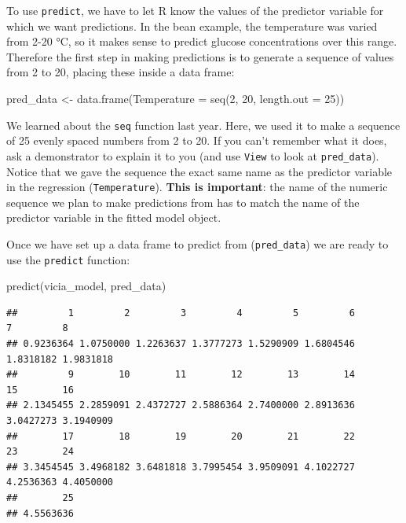 \documentclass[
]{book}
\newenvironment{Shaded}{\begin{snugshade}}{\end{snugshade}}
\newcommand{\AttributeTok}[1]{\textcolor[rgb]{0.77,0.63,0.00}{#1}}
\newcommand{\DecValTok}[1]{\textcolor[rgb]{0.00,0.00,0.81}{#1}}
\newcommand{\FunctionTok}[1]{\textcolor[rgb]{0.00,0.00,0.00}{#1}}
\newcommand{\NormalTok}[1]{#1}
\newcommand{\OtherTok}[1]{\textcolor[rgb]{0.56,0.35,0.01}{#1}}
\begin{document}
To use \texttt{predict}, we have to let R know the values of the predictor variable for which we want predictions. In the bean example, the temperature was varied from 2-20 °C, so it makes sense to predict glucose concentrations over this range. Therefore the first step in making predictions is to generate a sequence of values from 2 to 20, placing these inside a data frame:

\begin{Shaded}
\begin{Highlighting}[]
\NormalTok{pred\_data }\OtherTok{\textless{}{-}} \FunctionTok{data.frame}\NormalTok{(}\AttributeTok{Temperature =} \FunctionTok{seq}\NormalTok{(}\DecValTok{2}\NormalTok{, }\DecValTok{20}\NormalTok{, }\AttributeTok{length.out =} \DecValTok{25}\NormalTok{))}
\end{Highlighting}
\end{Shaded}

We learned about the \texttt{seq} function last year. Here, we used it to make a sequence of 25 evenly spaced numbers from 2 to 20. If you can't remember what it does, ask a demonstrator to explain it to you (and use \texttt{View} to look at \texttt{pred\_data}). Notice that we gave the sequence the exact same name as the predictor variable in the regression (\texttt{Temperature}). \textbf{This is important}: the name of the numeric sequence we plan to make predictions from has to match the name of the predictor variable in the fitted model object.

Once we have set up a data frame to predict from (\texttt{pred\_data}) we are ready to use the \texttt{predict} function:

\begin{Shaded}
\begin{Highlighting}[]
\FunctionTok{predict}\NormalTok{(vicia\_model, pred\_data)}
\end{Highlighting}
\end{Shaded}

\begin{verbatim}
##         1         2         3         4         5         6         7         8 
## 0.9236364 1.0750000 1.2263637 1.3777273 1.5290909 1.6804546 1.8318182 1.9831818 
##         9        10        11        12        13        14        15        16 
## 2.1345455 2.2859091 2.4372727 2.5886364 2.7400000 2.8913636 3.0427273 3.1940909 
##        17        18        19        20        21        22        23        24 
## 3.3454545 3.4968182 3.6481818 3.7995454 3.9509091 4.1022727 4.2536363 4.4050000 
##        25 
## 4.5563636
\end{verbatim}
\end{document}
